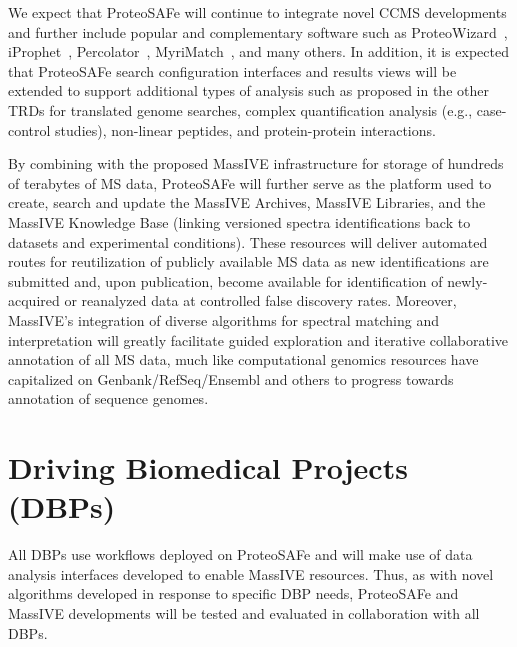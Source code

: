 \documentclass[arial,11pt]{article}
\newcommand{\SF}[1]{\textsf{#1}}
\newcommand{\SYSTEM}[0]{\SF{ProteoSAFe}\xspace}
\begin{document}
We expect that \SYSTEM will continue to integrate novel CCMS developments
and further include popular and complementary software such as ProteoWizard~\cite{Kessner:2008}, iProphet~\cite{Shteynberg:2011}, Percolator~\cite{Spivak:2009}, MyriMatch~\cite{Tabb:2007}, and many others. In addition, it is expected that \SYSTEM search configuration interfaces and results views will be extended to support additional types of analysis such as proposed in the other TRDs for translated genome searches, complex quantification analysis (e.g., case-control studies), non-linear peptides, and protein-protein interactions.

By combining with the proposed MassIVE infrastructure for storage of hundreds of terabytes of MS data, \SYSTEM will further serve as the platform used to create, search and update the MassIVE Archives,
MassIVE Libraries,
 and the MassIVE Knowledge Base (linking versioned spectra identifications back to datasets and experimental conditions). These resources will deliver automated routes for reutilization of publicly available MS  data as new identifications are submitted and, upon publication, become available for identification of newly-acquired or reanalyzed data at controlled false discovery rates. Moreover, MassIVE's integration of diverse algorithms for spectral matching and interpretation will greatly facilitate guided exploration and iterative collaborative annotation of all MS data, much like computational genomics resources have capitalized on Genbank/RefSeq/Ensembl and others to progress towards  annotation of sequence genomes.

\section{Driving Biomedical Projects (DBPs)}

All DBPs use workflows deployed on ProteoSAFe and will make use of data analysis interfaces developed to enable MassIVE resources. Thus, as with novel algorithms developed in response to specific DBP needs, ProteoSAFe and MassIVE developments will be tested and evaluated in collaboration with all DBPs.


%



\end{document}
